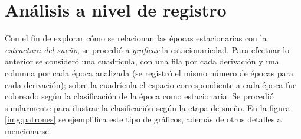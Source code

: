 \documentclass[12pt,letterpaper]{book}
\begin{document}
\section{Análisis a nivel de registro}
\label{sec:analisis_registro}

Con el fin de explorar cómo se relacionan las épocas estacionarias con la \textit{estructura del sueño}, se procedió a \textit{graficar} la estacionariedad.
%
Para efectuar lo anterior se consideró una cuadrícula, con una fila por cada derivación y una columna por cada época analizada (se registró el mismo número de épocas para cada derivación); sobre la cuadrícula el espacio correspondiente a cada época fue coloreado  según la clasificación de la época como estacionaria.
%
Se procedió similarmente para ilustrar la clasificación según la etapa de sueño.
%
En la figura \ref{img:patrones} se ejemplifica este tipo de gráficos, además de otros detalles a mencionarse.
\end{document}
